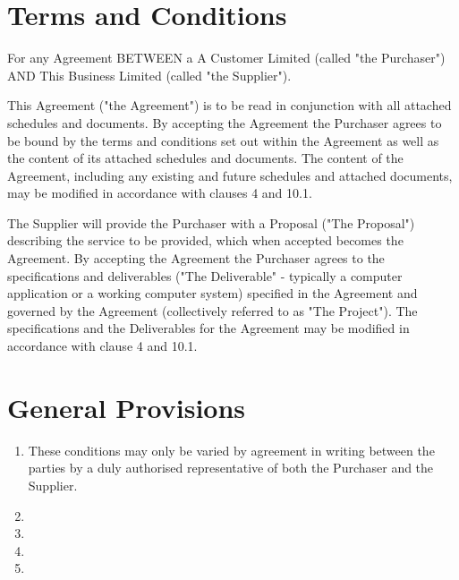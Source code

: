 \documentclass{article}
\begin{document}
\section*{Terms and Conditions}

For any Agreement BETWEEN a A Customer Limited (called "the Purchaser") AND This
Business Limited (called "the Supplier").

This Agreement ("the Agreement") is to be read in conjunction with all
attached schedules and documents. By accepting the Agreement the Purchaser
agrees to be bound by the terms and conditions set out within the Agreement
as well as the content of its attached schedules and documents. The content
of the Agreement, including any existing and future schedules and attached
documents, may be modified in accordance with clauses 4 and 10.1.

The Supplier will provide the Purchaser with a Proposal ("The Proposal")
describing the service to be provided, which when accepted becomes the
Agreement. By accepting the Agreement the Purchaser agrees to the
specifications and deliverables ("The Deliverable" - typically a computer
application or a working computer system) specified in the Agreement and
governed by the Agreement (collectively referred to as "The Project"). The
specifications and the Deliverables for the Agreement may be modified in
accordance with clause 4 and 10.1.











\section{General Provisions}

\begin{enumerate}
\item These conditions may only be varied by agreement in writing between the
parties by a duly authorised representative of both the Purchaser and the
Supplier.
\item 
\item 
\item 
\item 
\end{enumerate}




\pagebreak

\end{document}
